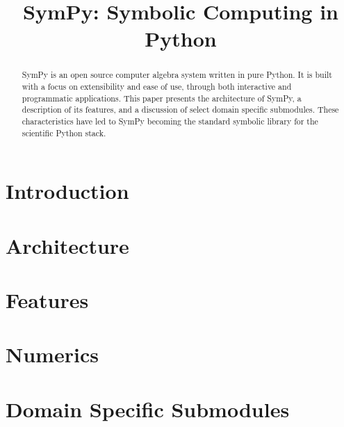 \documentclass[review]{siamart0216}
\title{SymPy: Symbolic Computing in Python}
\begin{document}
\maketitle

\begin{abstract}
  SymPy is an open source computer algebra system written in pure Python. It
  is built with a focus on extensibility and ease of use, through both
  interactive and programmatic applications. This paper presents the
  architecture of SymPy, a description of its features, and a discussion of
  select domain specific submodules. These characteristics have led to
  SymPy becoming the standard symbolic library for the scientific Python stack.
\end{abstract}

\section{Introduction}




\section{Architecture}
\label{sec:architecture}



\section{Features}
\label{sec:features}





\section{Numerics}
\label{sec:numerics}





\section{Domain Specific Submodules}
\label{sec:domain_specific}
\end{document}
